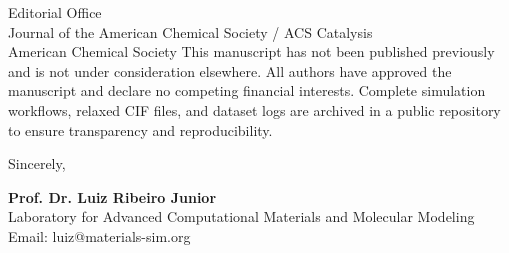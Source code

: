 \documentclass[11pt]{letter}
\begin{document}
\begin{letter}{Editorial Office \\
Journal of the American Chemical Society / ACS Catalysis \\
American Chemical Society}
This manuscript has not been published previously and is not under consideration elsewhere. All authors have approved the manuscript and declare no competing financial interests. Complete simulation workflows, relaxed CIF files, and dataset logs are archived in a public repository to ensure transparency and reproducibility.

\closing{Sincerely,}

\noindent
\textbf{Prof. Dr. Luiz Ribeiro Junior} \\
Laboratory for Advanced Computational Materials and Molecular Modeling \\
Email: luiz@materials-sim.org

\end{letter}
\end{document}
